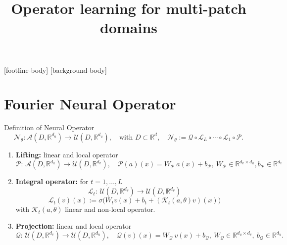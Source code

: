 \documentclass{beamer}
\title{Operator learning  \newline  for multi-patch domains}
\subtitle{}
\institute{{\inst{1}Departement of Mathematics, \newline University of Pavia}}
\newcommand{\numberset}{\mathbb}
\newcommand{\R}{\numberset{R}}
\begin{document}
\frame{\titlepage}

\addtocounter{framenumber}{-1}
[footline-body]
[background-body]


\section{Fourier Neural Operator}


\begin{frame}[t]{Definition of Neural Operator}
	\vspace{-0.5cm}
	\[ \mathcal{N}_{\theta} :\mathcal{A}(D, \R^{d_a}) \to \mathcal{U}(D, \R^{d_{u}}), \quad \text{with } D \subset \R^d, \quad	\mathcal{N}_{\theta} := \mathcal{Q} \circ \mathcal{L}_L \circ \cdots \circ \mathcal{L}_1 \circ \mathcal{P} . \]
	\vspace{-0.2cm}
	\begin{enumerate}
		\item \textbf{Lifting:} linear and local operator 
		\[\mathcal{P}:\, \mathcal{A}(D, \R^{d_a}) \to \mathcal{U}(D, \R^{d_{v}}), \quad  \mathcal{P}(a)(x) = W_{\mathcal{P}}\ a(x) + b_{\mathcal{P}}, \ W_{\mathcal{P}} \in \R^{d_{v} \times d_a}, b_{\mathcal{P}} \in \R^{d_v}\]
	\vspace{-0.2cm}
		\pause
		\item \textbf{Integral operator:} for $ t = 1, \dots, L $
		\[ \mathcal{L}_t : \, \mathcal{U}(D, \R^{d_{v}}) \to  \mathcal{U}(D, \R^{d_{v}}) \]
		\[  \mathcal{L}_t(v)(x) := \sigma\Big( W_t v(x)+ b_t + (\mathcal{K}_t(a, \theta) v)(x) \Big) \]
		with $ \mathcal{K}_t(a, \theta) $ linear and non-local operator.  
		\pause
		\item \textbf{Projection:} linear and local operator 
		\[\mathcal{Q}:\, \mathcal{U}(D, \R^{d_{v}}) \to  \mathcal{U}(D, \R^{d_{u}}), \quad  \mathcal{Q}(v)(x) = W_{\mathcal{Q}}\ v(x) + b_{\mathcal{Q}}, \ W_{\mathcal{Q}} \in \R^{d_{u} \times d_{v}}, \ b_{\mathcal{Q}}\in \R^{d_u}. \]		
	\end{enumerate}
\end{frame}

\end{document}
